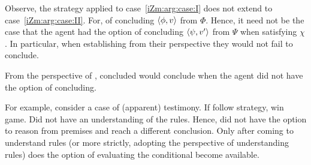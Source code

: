 \begin{note}
  Observe, the strategy applied to case~\ref{iZm:arg:case:I} does not extend to case~\ref{iZm:arg:case:II}.
  For, \requ{} of concluding \(\langle \phi, v \rangle\) from \(\Phi\).
  Hence, it need not be the case that the agent had the option of concluding \(\langle \psi, v' \rangle\) from \(\Psi\) when satisfying \(\chi\).
  In particular, when establishing from their perspective they would not fail to conclude.

  From the perspective of \izetaSm{}, concluded would conclude when the agent did not have the option of concluding.

  For example, consider a case of (apparent) testimony.
  If follow strategy, win game.
  Did not have an understanding of the rules.
  Hence, did not have the option to reason from premises and reach a different conclusion.
  Only after coming to understand rules (or more strictly, adopting the perspective of understanding rules) does the option of evaluating the conditional become available.
\end{note}

